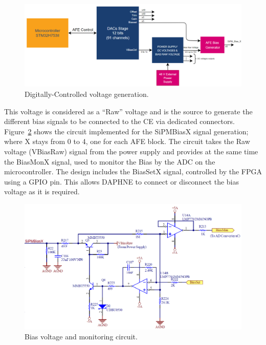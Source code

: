 \begin{figure}[htbp]
\centering %
\includegraphics[width=.8\textwidth,origin=c,angle=0]{Images/DACsStage.png}
\caption{\label{fig:DACsStage} Digitally-Controlled voltage generation.}
\end{figure}

This voltage is considered as a “Raw” voltage and is the source to generate the different bias signals to be connected to the CE via dedicated connectors.
Figure~\ref{fig:BiasCircuit} shows the circuit implemented for the SiPMBiasX signal generation; where X stays from 0 to 4, one for each AFE block. The circuit takes the Raw voltage (VBiasRaw) signal from the power supply and provides at the same time the BiasMonX signal, used to monitor the Bias by the ADC on the microcontroller. The design includes the BiasSetX signal, controlled by the FPGA using a GPIO pin. This allows DAPHNE to connect or disconnect the bias voltage as it is required.

\begin{figure}[htbp]
\centering %
\includegraphics[width=.8\textwidth,origin=c,angle=0]{Images/BiasCircuit_v2.png}
\caption{\label{fig:BiasCircuit} Bias voltage and monitoring circuit.}
\end{figure}

